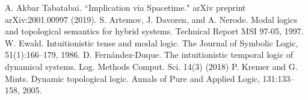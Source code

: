 \documentclass[12pt,a4paper]{article}
\theoremstyle{plain}
\theoremstyle{definition}
\begin{document}
\begin{thebibliography}{99}

A. Akbar Tabatabai. ``Implication via Spacetime." arXiv preprint arXiv:2001.00997 (2019).
S. Artemov, J. Davoren, and A. Nerode. Modal logics and topological semantics for hybrid systems. Technical Report MSI 97-05, 1997.
W. Ewald. Intuitionistic tense and modal logic. The Journal of Symbolic Logic, 51(1):166–179, 1986.
D. Fernández-Duque. The intuitionistic temporal logic of dynamical systems. Log. Methods Comput. Sci. 14(3) (2018)
P. Kremer and G. Mints. Dynamic topological logic. Annals of Pure and Applied Logic, 131:133–158, 2005.

\end{thebibliography}
\end{document}
